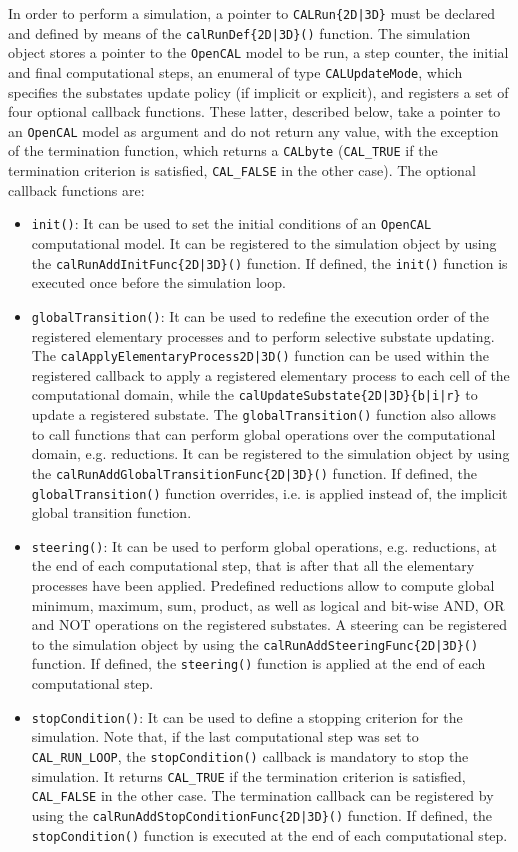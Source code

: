In order to perform a simulation, a pointer to \verb'CALRun{2D|3D}'
must be declared and defined by means of the
\verb'calRunDef{2D|3D}()' function. The simulation object stores a
pointer to the \texttt{OpenCAL} model to be run, a step counter, the initial
and final computational steps, an enumeral of type
\verb'CALUpdateMode', which specifies the substates update policy
(if implicit or explicit), and registers a set of four optional
callback functions. These latter, described below, take a pointer to
an \texttt{OpenCAL} model as argument and do not return any value, with the
exception of the termination function, which returns a
\verb'CALbyte' (\verb'CAL_TRUE' if the termination criterion is
satisfied, \verb'CAL_FALSE' in the other case). The optional
callback functions are:
\begin{itemize}
	\item \verb'init()': It can be used to set the initial conditions of
	an \texttt{OpenCAL} computational model. It can be registered to the
	simulation object by using the \verb'calRunAddInitFunc{2D|3D}()'
	function. If defined, the \verb'init()' function is executed once
	before the simulation loop.
	\item \verb'globalTransition()': It can be used to redefine the
	execution order of the registered elementary processes and to
	perform selective substate updating.\hfil \\The \texttt{calApplyElementaryProcess{2D|3D}()} function can be used
	within the registered callback to apply a registered elementary
	process to each cell of the computational domain, while the
	\verb'calUpdateSubstate{2D|3D}{b|i|r}' to update a registered
	substate. The \verb'globalTransition()' function also allows to
	call functions that can perform global operations over the
	computational domain, e.g. reductions. It can be registered to the
	simulation object by using the
	\verb'calRunAddGlobalTransitionFunc{2D|3D}()' function. If
	defined, the \verb'globalTransition()' function overrides, i.e. is
	applied instead of, the implicit global transition function.
	\item \verb'steering()': It can be used to perform global
	operations, e.g. reductions, at the end of each computational
	step, that is after that all the elementary processes have been
	applied. Predefined reductions allow to compute global minimum,
	maximum, sum, product, as well as logical and bit-wise AND, OR and
	NOT operations on the registered substates. A steering can be
	registered to the simulation object by using the
	\verb'calRunAddSteeringFunc{2D|3D}()' function. If defined, the
	\verb'steering()' function is applied at the end of each
	computational step.
	\item \verb'stopCondition()': It can be used to define a stopping
	criterion for the simulation. Note that, if the last computational
	step was set to \verb'CAL_RUN_LOOP', the \verb'stopCondition()'
	callback is mandatory to stop the simulation. It returns
	\verb'CAL_TRUE' if the termination criterion is satisfied,
	\verb'CAL_FALSE' in the other case. The termination callback can
	be registered by using the
	\verb'calRunAddStopConditionFunc{2D|3D}()' function. If defined,
	the \verb'stopCondition()' function is executed at the end of each
	computational step.
\end{itemize}
